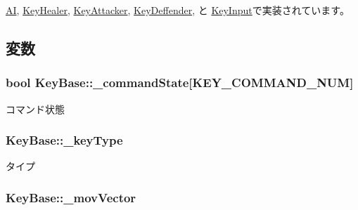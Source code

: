 \hyperlink{class_a_i_a59e5ab0650eb03f2e71bc8930fd9a8d5}{A\-I}, \hyperlink{class_key_healer_a4f38c5471c7529cc666ec3c1cd73f5d4}{Key\-Healer}, \hyperlink{class_key_attacker_a274203ec57ef80b07d3816570c9588e4}{Key\-Attacker}, \hyperlink{class_key_deffender_a7262f14770e5cdc20b5e717b98b9a1e2}{Key\-Deffender}, と \hyperlink{class_key_input_a58c96a548a58d392336ef4b890470929}{Key\-Input}で実装されています。



\subsection{変数}
\hypertarget{class_key_base_a2ac4c1873c45fdc14f6baf86cfbbbea4}{
\subsubsection[{\-\_\-command\-State}]{\setlength{\rightskip}{0pt plus 5cm}bool Key\-Base\-::\-\_\-command\-State\mbox{[}{\bf K\-E\-Y\-\_\-\-C\-O\-M\-M\-A\-N\-D\-\_\-\-N\-U\-M}\mbox{]}\hspace{0.3cm}{\ttfamily [protected]}}}\label{class_key_base_a2ac4c1873c45fdc14f6baf86cfbbbea4}


コマンド状態 

\hypertarget{class_key_base_ae1164cb4054102ae260eb5dede5c2b48}{
\subsubsection[{\-\_\-key\-Type}]{ Key\-Base\-::\-\_\-key\-Type\hspace{0.3cm}{\ttfamily [protected]}}}\label{class_key_base_ae1164cb4054102ae260eb5dede5c2b48}


タイプ 

\hypertarget{class_key_base_a6fea5a402d1fa892a14b9ba08ee7f84e}{
\subsubsection[{\-\_\-mov\-Vector}]{ Key\-Base\-::\-\_\-mov\-Vector\hspace{0.3cm}{\ttfamily [protected]}}}\label{class_key_base_a6fea5a402d1fa892a14b9ba08ee7f84e}


